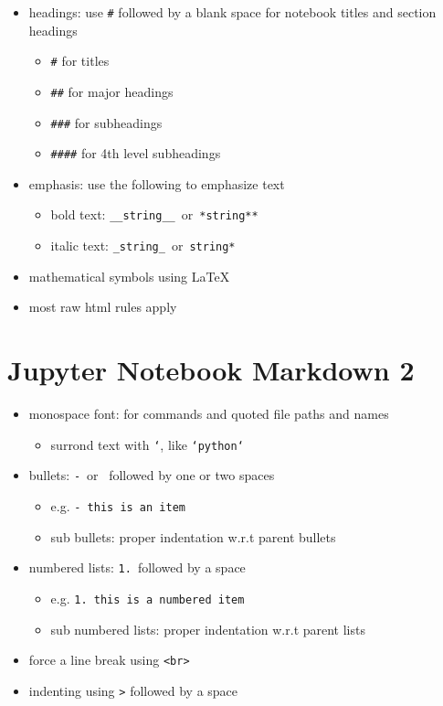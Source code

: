 \documentclass[11pt]{extarticle}
\begin{document}
\begin{itemize}
  \item headings: use {\tt \#} followed by a blank space for notebook titles and section headings
    \begin{itemize}
      \item {\tt \#} for titles
      \item {\tt \#\#} for major headings
      \item {\tt \#\#\#} for subheadings
      \item{\tt \#\#\#\#} for 4th level subheadings
    \end{itemize}
  \item emphasis: use the following to emphasize text
    \begin{itemize}
      \item bold text: {\tt \_\_string\_\_}$\,$ or $\,${\tt **string**}
      \item italic text: {\tt \_string\_}$\,$ or $\,${\tt *string*}
    \end{itemize}
  \item mathematical symbols using \LaTeX{}
  \item most raw html rules apply 
\end{itemize}

\newpage

\section*{Jupyter Notebook Markdown 2}

\begin{itemize}
  \item monospace font: for commands and quoted file paths and names 
    \begin{itemize}
      \item surrond text with {\tt `}, like {\tt `python`}
    \end{itemize}
  \item bullets: {\tt -}$\,$ or $\,${\tt *} followed by one or two spaces
    \begin{itemize}
      \item e.g. {\tt - this is an item}
      \item sub bullets: proper indentation w.r.t parent bullets 
    \end{itemize}
  \item numbered lists: {\tt 1.}$\,$ followed by a space
    \begin{itemize}
      \item e.g. {\tt 1.\,this is a numbered item}
      \item sub numbered lists: proper indentation w.r.t parent lists 
    \end{itemize}
  \item force a line break using {\tt <br>}
  \item indenting using {\tt >} followed by a space
\end{itemize}
\end{document}
